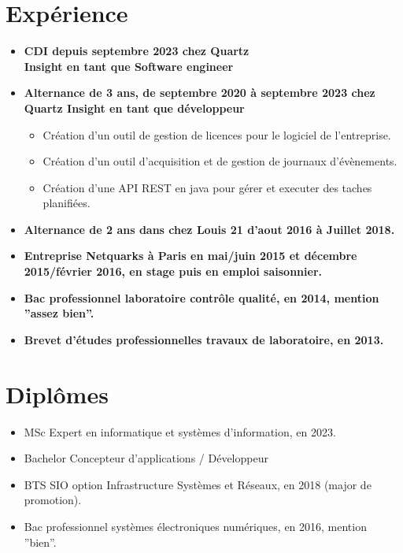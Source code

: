 \documentclass[10pt,a4paper,oneside]{article}
\begin{document}
\begin{multicols}{2}
\section*{Expérience}
\begin{itemize}
    \item \textbf{CDI depuis septembre 2023 chez Quartz \\
      Insight en tant que Software engineer}
    \item \textbf{Alternance de 3 ans, de septembre 2020 à septembre 2023 chez Quartz Insight en tant que développeur}
    \begin{itemize}
        \item Création d’un outil de gestion de licences pour le logiciel de l’entreprise.
        \item Création d’un outil d’acquisition et de gestion de journaux d’évènements.
        \item Création d’une API REST en java pour gérer et executer des taches planifiées.
    \end{itemize}
    \item \textbf{Alternance de 2 ans dans chez Louis 21 d’aout 2016 à Juillet 2018.}
    \item \textbf{Entreprise Netquarks à Paris en mai/juin 2015 et décembre 2015/février 2016, en stage puis en emploi saisonnier.}
    \item \textbf{Bac professionnel laboratoire contrôle qualité, en 2014, mention ”assez bien”.}
    \item \textbf{Brevet d’études professionnelles travaux de laboratoire, en 2013.}
\end{itemize}

\section*{Diplômes}
\begin{itemize}
    \item MSc Expert en informatique et systèmes d’information, en 2023.
    \item Bachelor Concepteur d’applications / Développeur
    \item BTS SIO option Infrastructure Systèmes et Réseaux, en 2018 (major de promotion).
    \item Bac professionnel systèmes électroniques numériques, en 2016, mention ”bien”.
\end{itemize}


\end{multicols}
\end{document}
